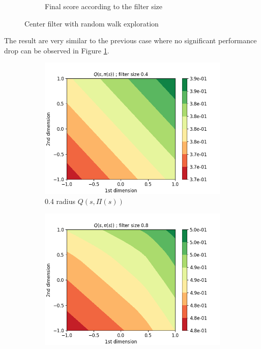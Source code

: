 \documentclass{article}
\begin{document}
\begin{figure}[H]
\begin{subfigure}[b]{0.4\linewidth}
    \caption{Final score according to the filter size}
  \end{subfigure}
   \caption{Center filter with random walk exploration}
   \label{fig:center_curves_random_walk}
\end{figure}

The result are very similar to the previous case where no significant performance drop can be observed in Figure \ref{fig:center_curves_random_walk}.

\begin{figure}[H]
  \centering
   \begin{subfigure}[b]{0.3\linewidth}
    \includegraphics[width=\linewidth]{Study_2/2.2/visualizations/Q_contour_0_4.png}
      \caption{0.4 radius $Q(s, \Pi(s))$}
  \end{subfigure}
   \begin{subfigure}[b]{0.3\linewidth}
    \includegraphics[width=\linewidth]{Study_2/2.2/visualizations/Q_contour_0_8.png}

\end{subfigure}
\end{figure}
\end{document}
